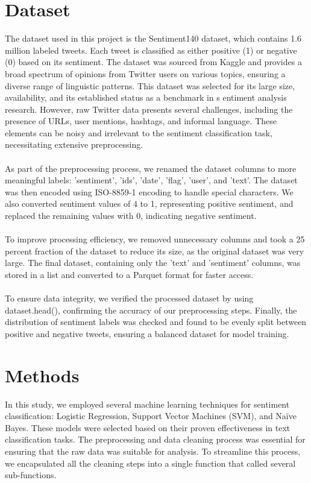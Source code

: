 \documentclass[conference]{IEEEtran}
\begin{document}
\section{Dataset}
The dataset used in this project is the Sentiment140 dataset, which contains 1.6 million labeled tweets. Each tweet is classified as either positive 
(1) or negative (0) based on its sentiment. The dataset was sourced from Kaggle and provides a broad spectrum of opinions from Twitter users on various topics,
 ensuring a diverse range of linguistic patterns. This dataset was selected for its large size, availability, and its established status as a benchmark in s
 entiment analysis research. However, raw Twitter data presents several challenges, including the presence of URLs, user mentions, hashtags, and informal language. 
 These elements can be noisy and irrelevant to the sentiment classification task, necessitating extensive preprocessing.
\\
\\
As part of the preprocessing process, we renamed the dataset columns to more meaningful labels: 'sentiment', 'ids', 'date', 'flag', 'user', and 'text'. 
The dataset was then encoded using ISO-8859-1 encoding to handle special characters. We also converted sentiment values of 4 to 1, representing positive sentiment, 
and replaced the remaining values with 0, indicating negative sentiment. 
\\
\\
To improve processing efficiency, we removed unnecessary columns and took a 25 percent
fraction of the dataset to reduce its size, as the original dataset was very large. The final dataset, containing only the 'text' and 'sentiment' columns, was 
stored in a list and converted to a Parquet format for faster access. 
\\
\\
To ensure data integrity, we verified the processed dataset by using dataset.head(), 
confirming the accuracy of our preprocessing steps. Finally, the distribution of sentiment labels was checked and found to be evenly split between positive 
and negative tweets, ensuring a balanced dataset for model training.

\section{Methods}
In this study, we employed several machine learning techniques for sentiment classification: Logistic Regression, Support Vector Machines (SVM), and Naïve Bayes. 
These models were selected based on their proven effectiveness in text classification tasks.
 The preprocessing and data cleaning process was essential for ensuring that the raw data was suitable for analysis. 
 To streamline this process, we encapsulated all the cleaning steps into a single function that called several sub-functions. 
 \\ \\ 
\end{document}
